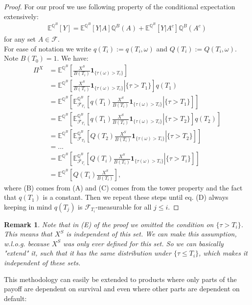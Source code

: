\documentclass[12pt]{article}
\newtheorem{remark}[theorem]{Remark}
\begin{document}
	\begin{proof} 
		For our proof we use following property of the conditional expectation extensively:
		\begin{align*}
			\mathbb{E}^{\mathbb{Q}^B}\left[Y\right] = \mathbb{E}^{\mathbb{Q}^B}\left[Y | A\right]\mathbb{Q}^B(A) + \mathbb{E}^{\mathbb{Q}^B}\left[Y | A^c\right]\mathbb{Q}^B(A^c) \tag{A}
		\end{align*}
		for any set $A \in \mathcal{F}$.\\
		For ease of notation we write $q(T_i):= q(T_i, \omega)$ and $Q(T_i):= Q(T_i, \omega)$. Note $B(T_0) = 1$. We have:
		\begin{align*}
			\Pi^X &=  \mathbb{E}^{\mathbb{Q}^B}\left[\frac{X^S}{B(T_i)} \mathbf{1}_{\{\tau(\omega) > T_i\}} \right]\\
			&=
			\mathbb{E}^{\mathbb{Q}^B}\left[\left.\frac{X^S}{B(T_i)} \mathbf{1}_{\{\tau(\omega) > T_i\}} \right| \{\tau > T_1\} \right]q(T_1) \tag{B}\\
			&=
			\mathbb{E}^{\mathbb{Q}^B}\left[\mathbb{E}^{\mathbb{Q}^B}_{\mathcal{F}_{T_1}}\left[\left.q(T_1)\frac{X^S}{B(T_i)} \mathbf{1}_{\{\tau(\omega) > T_i\}} \right| \{\tau > T_1\}\right] \right]\tag{C}\\
			&=
			\mathbb{E}^{\mathbb{Q}^B}\left[\mathbb{E}^{\mathbb{Q}^B}_{\mathcal{F}_{T_1}}\left[\left.q(T_1)\frac{X^S}{B(T_i)} \mathbf{1}_{\{\tau(\omega) > T_i\}} \right| \{\tau > T_2\}\right] q(T_2)\right]\\
			&=\mathbb{E}^{\mathbb{Q}^B}\left[\mathbb{E}^{\mathbb{Q}^B}_{\mathcal{F}_{T_2}}\left[\left.Q(T_2)\frac{X^S}{B(T_i)} \mathbf{1}_{\{\tau(\omega) > T_i\}} \right| \{\tau > T_2\}\right] \right]\\
			&=...\\
			&= \mathbb{E}^{\mathbb{Q}^B}\left[\mathbb{E}^{\mathbb{Q}^B}_{\mathcal{F}_{T_i}}\left[\left.Q(T_i)\frac{X^S}{B(T_i)} \mathbf{1}_{\{\tau(\omega) > T_i\}} \right| \{\tau > T_i\}\right] \right] \tag{D}\\
			&= \mathbb{E}^{\mathbb{Q}^B}\left[Q(T_i)\frac{X^S}{B(T_i)}\right],\tag{E}
		\end{align*}
		where (B) comes from (A) and (C) comes from the tower property and the fact that $q(T_1)$ is a constant. Then we repeat these steps until eq. (D) always keeping in mind $q(T_j)$ is $\mathcal{F}_{T_i}$-measurable for all $j \le i$.
	\end{proof}
	\begin{remark}
		Note that in (E) of the proof we omitted the condition on $\{\tau > T_i\}$. This means that $X^S$ is independent of this set. We can make this assumption, w.l.o.g. because $X^S$ was only ever defined for this set. So we can basically "extend" it, such that it has the same distribution under $\{\tau \le T_i\}$, which makes it independent of these sets.
	\end{remark}
	This methodology can easily be extended to products where only parts of the payoff are dependent on survival and even where other parts are dependent on default:
	
\end{document}
